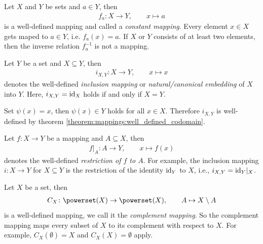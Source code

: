 \begin{examples}
    \begin{exampleenumerate}
        \item\label{example:mappings:constant_mapping} Let $X$ and $Y$ be sets and $a\in Y$, then
        \begin{align}f_a\colon X\rightarrow Y,\qquad x\mapsto a\end{align}
        is a well-defined mapping and called a \emph{constant mapping}. Every element $x\in X$ gets maped to $a\in Y$, i.e. $f_a(x)=a$. If $X$ or $Y$ consists of at least two elements, then the inverse relation $f_a^{-1}$ is not a mapping.
        \item Let $Y$ be a set and $X\subseteq Y$, then \begin{align}i_{X,Y}\colon X\rightarrow Y,\qquad x\mapsto x\end{align} denotes the well-defined \emph{inclusion mapping} or \emph{natural/canonical embedding} of $X$ into $Y$. Here, $i_{X,Y}=\text{id}_X$ holds if and only if $X=Y$.
        \begin{miniproof}
            Set $\psi(x)=x$, then $\psi(x)\in Y$ holds for all $x\in X$. Therefore $i_{X,Y}$ is well-defined by theorem \ref{theorem:mappings:well_defined_codomain}.
        \end{miniproof}
        \item\label{example:mappings:restriction} Let $f\colon X\rightarrow Y$ be a mapping and $A\subseteq X$, then \begin{align}f\vert_A\colon A\rightarrow Y,\qquad x\mapsto f(x)\end{align} denotes the well-defined \emph{restriction of $f$ to $A$}. For example, the inclusion mapping $i\colon X\rightarrow Y$ for $X\subseteq Y$ is the restriction of the identity $\text{id}_Y$ to $X$, i.e., $i_{X,Y}=\text{id}_Y\vert_X$.
        \item\label{example:mappings:complement_mapping} Let $X$ be a set, then
        \begin{align}C_X\colon \powerset(X)\rightarrow\powerset(X),\qquad A\mapsto X\setminus A\end{align}
        is a well-defined mapping, we call it the \emph{complement mapping}. So the complement mapping maps every subset of $X$ to its complement with respect to $X$. For example, $C_X(\emptyset)=X$ and $C_X(X)=\emptyset$ apply.
    \end{exampleenumerate}
\end{examples}

